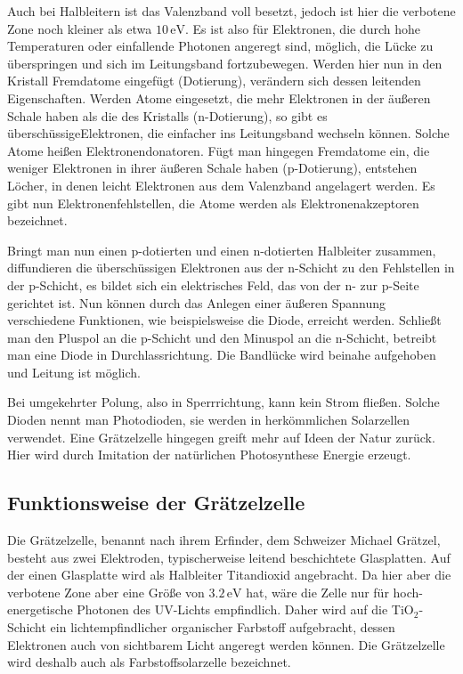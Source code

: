 \documentclass[11pt]{scrartcl}
\newcommand{\unit}[1]{\ensuremath{\,\mathrm{#1}}} %
\begin{document}
Auch bei Halbleitern ist das Valenzband voll besetzt, jedoch ist hier die verbotene Zone noch kleiner als etwa $10\unit{eV}$. Es ist also f\"ur Elektronen, die durch hohe Temperaturen oder einfallende Photonen angeregt sind, m\"oglich, die L\"ucke zu \"uberspringen und sich im Leitungsband fortzubewegen. Werden hier nun in den Kristall Fremdatome eingef\"ugt (Dotierung), ver\"andern sich dessen leitenden Eigenschaften. Werden Atome eingesetzt, die mehr Elektronen in der \"au\ss{}eren Schale haben als die des Kristalls (n-Dotierung), so gibt es \glqq\"ubersch\"ussige\grqq Elektronen, die einfacher ins Leitungsband wechseln k\"onnen. Solche Atome hei\ss{}en Elektronendonatoren. F\"ugt man hingegen Fremdatome ein, die weniger Elektronen in ihrer \"au\ss{}eren Schale haben (p-Dotierung), entstehen L\"ocher, in denen leicht Elektronen aus dem Valenzband angelagert werden. Es gibt nun Elektronenfehlstellen, die Atome werden als Elektronenakzeptoren bezeichnet.

Bringt man nun einen p-dotierten und einen n-dotierten Halbleiter zusammen, diffundieren die \"ubersch\"ussigen Elektronen aus der n-Schicht zu den Fehlstellen in der p-Schicht, es bildet sich ein elektrisches Feld, das von der n- zur p-Seite gerichtet ist. Nun k\"onnen durch das Anlegen einer \"au\ss{}eren Spannung verschiedene Funktionen, wie beispielsweise die Diode, erreicht werden. Schließt man den Pluspol an die p-Schicht und den Minuspol an die n-Schicht, betreibt man eine Diode in Durchlassrichtung. Die Bandl\"ucke wird beinahe aufgehoben und Leitung ist m\"oglich.

Bei umgekehrter Polung, also in Sperrrichtung, kann kein Strom flie\ss{}en. Solche Dioden nennt man Photodioden, sie werden in herk\"ommlichen Solarzellen verwendet. Eine Gr\"atzelzelle hingegen greift mehr auf Ideen der Natur zur\"uck. Hier wird durch Imitation der nat\"urlichen Photosynthese Energie erzeugt.



\subsection{Funktionsweise der Gr\"atzelzelle}
Die Gr\"atzelzelle, benannt nach ihrem Erfinder, dem Schweizer Michael Gr\"atzel, besteht aus zwei Elektroden, typischerweise leitend beschichtete Glasplatten. Auf der einen Glasplatte wird als Halbleiter Titandioxid angebracht. Da hier aber die verbotene Zone aber eine Gr\"o\ss{}e von $3.2\unit{eV}$ hat, w\"are die Zelle nur f\"ur hoch-energetische Photonen des UV-Lichts empfindlich. Daher wird auf die TiO$_{2}$-Schicht ein lichtempfindlicher organischer Farbstoff aufgebracht, dessen Elektronen auch von sichtbarem Licht angeregt werden k\"onnen. Die Gr\"atzelzelle wird deshalb auch als Farbstoffsolarzelle bezeichnet.
\end{document}
